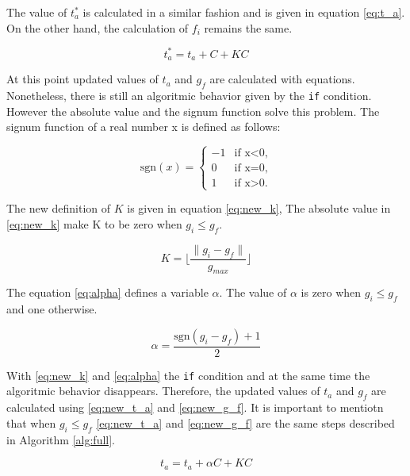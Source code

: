 \documentclass[
  12pt,
  a4paperpaper,
]{report}
\begin{document}
The value of \(t^{*}_a\) is calculated in a similar fashion and is given
in equation \ref{eq:t_a}. On the other hand, the calculation of \(f_i\)
remains the same.

\begin{equation}
t^{*}_a = t_a + C+ KC
\label{eq:t_a}
\end{equation}

At this point updated values of \(t_a\) and \(g_f\) are calculated with equations.
Nonetheless, there is still an algoritmic behavior given by the \texttt{if} condition. 
However the absolute value and the signum function solve this problem. 
The signum function of a real number x is defined as follows:

\begin{equation}
\mathrm{sgn}(x)=
    \begin{cases}
        -1  & \text{if    x<0,}\\
        0   & \text{if    x=0,}\\
        1   & \text{if    x>0.}
    \end{cases} 
\end{equation}

The new definition of  \(K\) is given in equation \ref{eq:new_k},
The absolute value in \ref{eq:new_k} make K to be zero when \(g_i \leq g_f\).

\begin{equation}
K = \lfloor \frac{ \| g_i - g_f \|}{g_{max}} \rfloor
\label{eq:new_k}
\end{equation}

The equation \ref{eq:alpha} defines a variable \(\alpha\).
The value of \(\alpha\) is zero when \(g_i \leq g_f\) and one otherwise.

\begin{equation}
\alpha =  \frac{ \mathrm{sgn}(g_i-g_f) + 1 }{2}
\label{eq:alpha}
\end{equation}

With \ref{eq:new_k} and \ref{eq:alpha} the \texttt{if} condition and at the same time the algoritmic behavior disappears. 
Therefore, the updated values of \(t_a\) and \(g_f\) are calculated using
\ref{eq:new_t_a} and \ref{eq:new_g_f}. 
It is important to mentiotn that  when
\(g_i \leq g_f\) \ref{eq:new_t_a} and \ref{eq:new_g_f} are the same steps described in Algorithm \ref{alg:full}.

\begin{equation}
t_a = t_a + \alpha C+ KC
\label{eq:new_t_a}
\end{equation}
\end{document}
